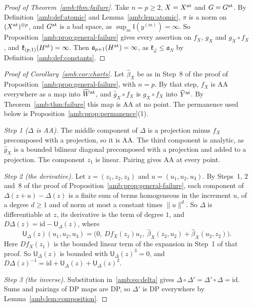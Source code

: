 \documentclass[11pt]{amsart}
\theoremstyle{definition}
\theoremstyle{remark}
\numberwithin{equation}{section}
\newcommand{\id}{\mathrm{id}}
\newcommand{\norm}[1]{\lVert #1\rVert}
\theoremstyle{plain}
\theoremstyle{definition}
\theoremstyle{plain}
\begin{document}
\begin{proof}[Proof of Theorem~\ref{amb:thm:failure}]
Take $n=p\ge2$, $X=X^{\rm at}$ and $G=G^{\rm at}$. By Definition~\ref{amb:def:atomic} and Lemma~\ref{amb:lem:atomic}, $\pi$ is a norm on $(X^{\rm at})^{\otimes p}$, and $G^{\rm at}$ is a bad space, as $\sup_m\mathfrak l(y^{(m)})=\infty$. So Proposition~\ref{amb:prop:general-failure} gives every assertion on $f_X$, $g_X$ and $g_X\circ f_X$, and $\mathfrak k_{(p,1)}(H^{\rm at})=\infty$. Then $\mathfrak a_{p+1}(H^{\rm at})=\infty$, as $\mathfrak k_{\vec n}\le\mathfrak a_N$ by Definition~\ref{amb:def:constants}.
\end{proof}

\begin{proof}[Proof of Corollary~\ref{amb:cor:charts}]
Let $\hat\beta_X$ be as in Step~8 of the proof of Proposition~\ref{amb:prop:general-failure}, with $n=p$. By that step, $f_X$ is AA everywhere as a map into $\widehat W^{\rm at}$, and $\hat g_X\circ f_X$ is $g_X\circ f_X$ into $\widehat Y^{\rm at}$. By Theorem~\ref{amb:thm:failure} this map is AA at no point. The permanence used below is Proposition~\ref{amb:prop:permanence}(1).

\emph{Step 1 ($\Delta$ is AA).} The middle component of $\Delta$ is a projection minus $f_X$ precomposed with a projection, so it is AA. The third component is analytic, as $\hat g_X$ is a bounded bilinear diagonal precomposed with a projection and added to a projection. The component $z_1$ is linear. Pairing gives AA at every point.

\emph{Step 2 (the derivative).} Let $z=(z_1,z_2,z_3)$ and $u=(u_1,u_2,u_3)$. By Steps~1, 2 and~8 of the proof of Proposition~\ref{amb:prop:general-failure}, each component of $\Delta(z+u)-\Delta(z)$ is a finite sum of terms homogeneous in the increment $u$, of a degree $d\ge1$ and of norm at most a constant times $\norm u^d$. So $\Delta$ is differentiable at $z$, its derivative is the term of degree $1$, and $D\Delta(z)=\id-\mathsf U_\Delta(z)$, where
\[
 \mathsf U_\Delta(z)(u_1,u_2,u_3)=\bigl(0,\ Df_X(z_1)u_1,\ \hat\beta_X(z_2,u_2)+\hat\beta_X(u_2,z_2)\bigr).
\]
Here $Df_X(z_1)$ is the bounded linear term of the expansion in Step~1 of that proof. So $\mathsf U_\Delta(z)$ is bounded with $\mathsf U_\Delta(z)^3=0$, and $D\Delta(z)^{-1}=\id+\mathsf U_\Delta(z)+\mathsf U_\Delta(z)^2$.

\emph{Step 3 (the inverse).} Substitution in~\eqref{amb:eq:delta} gives $\Delta\circ\Delta'=\Delta'\circ\Delta=\id$. Sums and pairings of DP maps are DP, so $\Delta'$ is DP everywhere by Lemma~\ref{amb:lem:composition}.


\end{proof}
\end{document}

